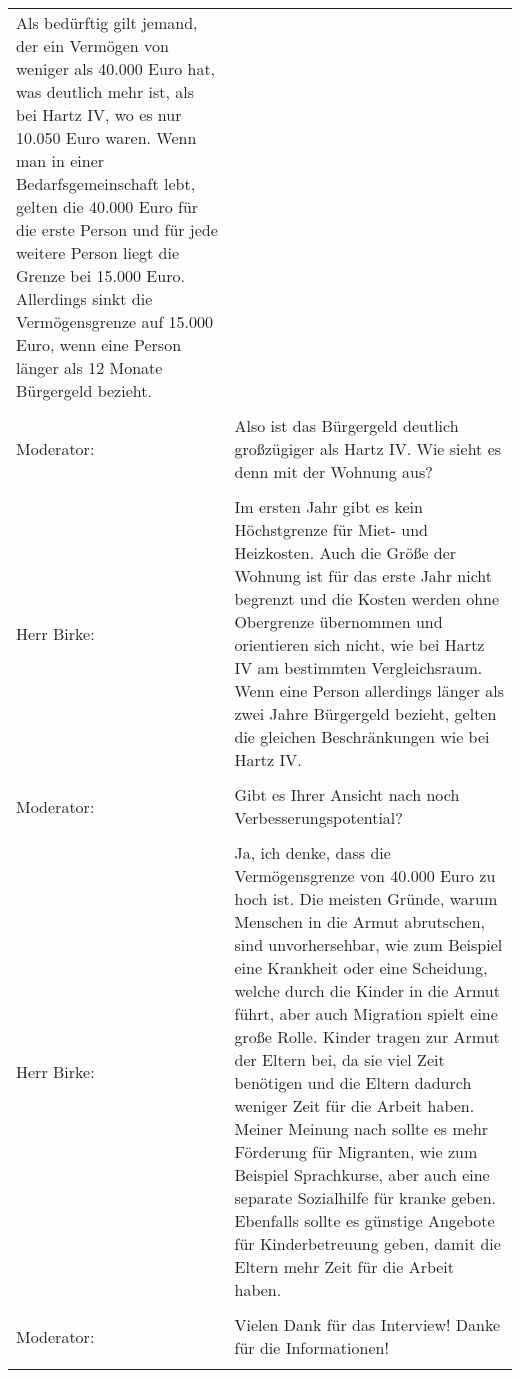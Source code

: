 \documentclass[11pt,a4paper]{article}
\begin{document}
\begin{longtable}[c]{p{3cm}p{9cm}}
        Als bedürftig gilt jemand, der ein Vermögen von weniger als 40.000 Euro hat, was deutlich mehr ist, als bei Hartz IV, wo es nur 10.050 Euro waren.
        Wenn man in einer Bedarfsgemeinschaft lebt, gelten die 40.000 Euro für die erste Person und für jede weitere Person liegt die Grenze bei 15.000 Euro.
        Allerdings sinkt die Vermögensgrenze auf 15.000 Euro, wenn eine Person länger als 12 Monate Bürgergeld bezieht. \\\\
        Moderator: & Also ist das Bürgergeld deutlich großzügiger als Hartz IV. Wie sieht es denn mit der Wohnung aus? \\\\
        Herr Birke: & Im ersten Jahr gibt es kein Höchstgrenze für Miet- und Heizkosten.
        Auch die Größe der Wohnung ist für das erste Jahr nicht begrenzt und die Kosten werden ohne Obergrenze übernommen und orientieren sich nicht, wie bei Hartz IV am bestimmten Vergleichsraum.
        Wenn eine Person allerdings länger als zwei Jahre Bürgergeld bezieht, gelten die gleichen Beschränkungen wie bei Hartz IV. \\\\
        Moderator: & Gibt es Ihrer Ansicht nach noch Verbesserungspotential? \\\\
        Herr Birke: & Ja, ich denke, dass die Vermögensgrenze von 40.000 Euro zu hoch ist.
        Die meisten Gründe, warum Menschen in die Armut abrutschen, sind unvorhersehbar, wie zum Beispiel eine Krankheit oder eine Scheidung, welche durch die Kinder in die Armut führt, aber auch Migration spielt eine große Rolle.
        Kinder tragen zur Armut der Eltern bei, da sie viel Zeit benötigen und die Eltern dadurch weniger Zeit für die Arbeit haben.
        Meiner Meinung nach sollte es mehr Förderung für Migranten, wie zum Beispiel Sprachkurse, aber auch eine separate Sozialhilfe für kranke geben.
        Ebenfalls sollte es günstige Angebote für Kinderbetreuung geben, damit die Eltern mehr Zeit für die Arbeit haben. \\\\
        Moderator: & Vielen Dank für das Interview! Danke für die Informationen! \\\\
    \end{longtable}
\end{document}
